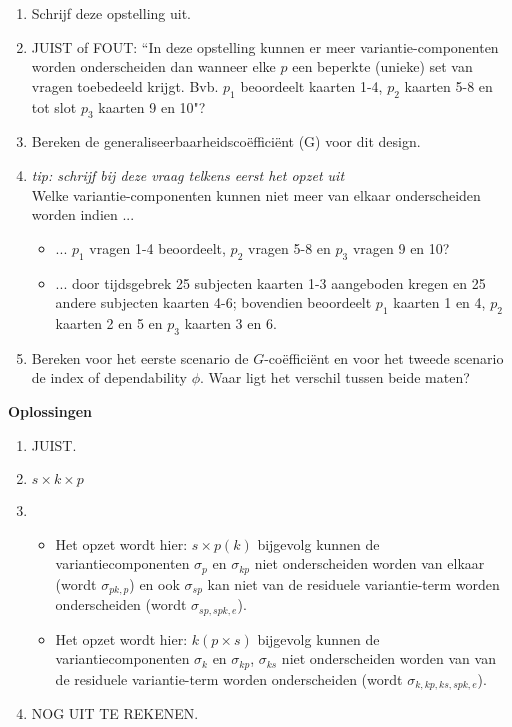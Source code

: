 {\begin{enumerate}
\begin{enumerate}
	\item Schrijf deze opstelling uit.
	\item JUIST of FOUT: ``In deze opstelling kunnen er meer variantie-componenten worden onderscheiden dan wanneer elke $p$ een beperkte (unieke) set van vragen toebedeeld krijgt. Bvb. $p_1$ beoordeelt kaarten 1-4, $p_2$ kaarten 5-8 en tot slot $p_3$ kaarten 9 en 10"?
	\item Bereken de generaliseerbaarheidsco\"{e}ffici\"{e}nt (G) voor dit design.
	\item \emph{tip: schrijf bij deze vraag telkens eerst het opzet uit}\\
	Welke variantie-componenten kunnen niet meer van elkaar onderscheiden worden indien ... 
\begin{itemize}
	\item ... $p_1$ vragen 1-4 beoordeelt, $p_2$ vragen 5-8 en $p_3$ vragen 9 en 10?
	\item ... door tijdsgebrek 25 subjecten kaarten 1-3 aangeboden kregen en 25 andere subjecten kaarten 4-6; bovendien beoordeelt $p_1$ kaarten 1 en 4, $p_2$ kaarten 2 en 5 en $p_3$ kaarten 3 en 6.
\end{itemize}
\item Bereken voor het eerste scenario de $G$-co\"{e}ffici\"{e}nt en voor het tweede scenario de index of dependability $\phi$. Waar ligt het verschil tussen beide maten?
\end{enumerate}
\end{enumerate}
}

\OPLOSSING
{
\textbf{Oplossingen}
\begin{enumerate}
\item JUIST.
\item $s \times k \times p$
\item 
\begin{itemize}
	\item Het opzet wordt hier: $s\times p\left(k\right)$ bijgevolg kunnen de variantiecomponenten $\sigma_p$ en $\sigma_{kp}$ niet onderscheiden worden van elkaar (wordt $\sigma_{pk,p}$) en ook $\sigma_{sp}$ kan niet van de residuele variantie-term worden onderscheiden (wordt $\sigma_{sp, spk,e}$).
	\item Het opzet wordt hier: $k\left(p\times s\right)$ bijgevolg kunnen de variantiecomponenten $\sigma_k$ en $\sigma_{kp}$, $\sigma_{ks}$ niet onderscheiden worden van  van de residuele variantie-term worden onderscheiden (wordt $\sigma_{k, kp, ks, spk, e}$).  
\end{itemize}
\item NOG UIT TE REKENEN.
\end{enumerate} 
}

